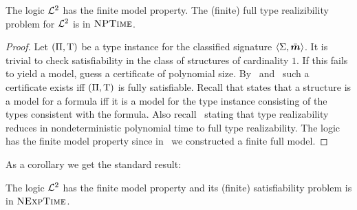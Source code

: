 \begin{proposition}
The logic $\mathcal{L}^{2}$ has the finite model property. The (finite) full type
realizibility problem for $\mathcal{L}^{2}$ is in $\text{\normalfont{\scshape NPTime}}$.
\end{proposition}
\begin{proof}
Let $(\Pi,\mathrm{T})$ be a type instance for the classified signature
$\left\langle \mathrm{\Sigma},\bar{\bm{m}} \right\rangle$.
It is trivial to check satisfiability in the class of structures of cardinality
$1$. If this fails to yield a model, guess a certificate of polynomial size.
By~ and~ such a certificate exists
iff $(\Pi,\mathrm{T})$ is fully satisfiable.
Recall that  states that a structure is a model for a
formula iff it is a model for the type instance consisting of the types
consistent with the formula. Also recall~
stating that type realizability reduces in nondeterministic polynomial time to
full type realizability. The logic has the finite model property since
in~ we constructed a finite full model.
\end{proof}
As a corollary we get the standard result:
\begin{corollary}
The logic $\mathcal{L}^{2}$ has the finite model property and its (finite) satisfiability
problem is in $\text{\normalfont{\scshape NExpTime}}$.
\end{corollary}